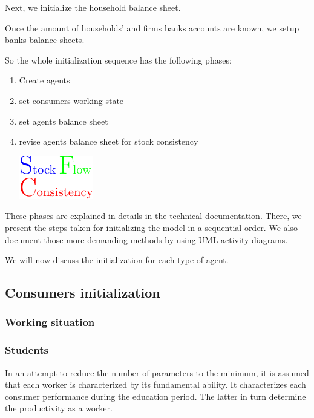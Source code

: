 \documentclass{book}
\newcommand{\doclocation}{file:///Users/giulioni/Documents/workspace/gabriele/docs}
\begin{document}
Next, we initialize the household balance sheet.

Once the amount of households' and firms banks accounts are known, we setup banks balance sheets.

So the whole initialization sequence has the following phases:
\begin{enumerate}
	\item Create agents
	\item set consumers working state
	\item set agents balance sheet
	\item revise agents balance sheet for stock consistency\begin{marginfigure}
	\hskip1cm\includegraphics[scale=1.0]{sfc_logo-0.pdf}
\end{marginfigure}

\end{enumerate}

These phases are explained in details in the \href{\doclocation/index_initialization.html}{technical documentation}. There, we present the steps taken for initializing the model in a sequential order. We also document those more demanding methods by using UML activity diagrams.

We will now discuss the initialization for each type of agent.

\subsection{Consumers initialization}

\subsubsection{Working situation}


\subsubsection*{Students}
\label{pref:tudentevolution}

In an attempt to reduce the number of parameters to the minimum, it is assumed that each worker is characterized by its fundamental ability. It characterizes each consumer performance during the education period. The latter in turn determine the productivity as a worker.
\end{document}
